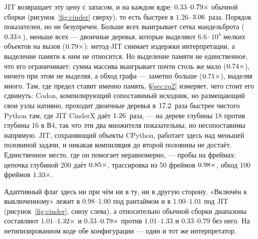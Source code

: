 JIT возвращает эту цену с запасом, и на каждом ядре: $0.33$--$\meas{ratio:b6_cinderx-fork_jit:binarytrees/fork_jit|b6_cinderx-stock:binarytrees/stock}{0.79}\times$ обычной сборки
(рисунок~\ref{fig:cinder} сверху), то есть быстрее в $1.26$--$\meas{ratio:b6_cinderx-stock:mandelbrot/stock|b6_cinderx-fork_jit:mandelbrot/fork_jit}{3.06}$~раза. Порядок показателен, но
не безупречен. Больше всех выигрывает сетка мандельброта ($\meas{ratio:b6_cinderx-fork_jit:mandelbrot/fork_jit|b6_cinderx-stock:mandelbrot/stock}{0.33}\times$), меньше всех --- двоичные
деревья, которые выделяют $6.6\cdot10^4$ мелких объектов на вызов ($\meas{ratio:b6_cinderx-fork_jit:binarytrees/fork_jit|b6_cinderx-stock:binarytrees/stock}{0.79}\times$): метод-JIT снимает
издержки интерпретации, а выделение памяти к ним не относится. Но выделение памяти не
единственное, что его ограничивает: сумма массива выигрывает почти столь же мало ($\meas{ratio:b6_cinderx-fork_jit:arraysum/fork_jit|b6_cinderx-stock:arraysum/stock}{0.74}\times$),
ничего при этом не выделяя, а обход графа --- заметно больше ($\meas{ratio:b6_cinderx-fork_jit:bfs/fork_jit|b6_cinderx-stock:bfs/stock}{0.71}\times$), выделяя много. Там,
где предел ставит именно память, \S\ref{sec:rq2} измеряет, чего стоит его сдвинуть: Codon,
компилирующий сопоставимый исходник, но размещающий свои узлы нативно, проходит двоичные деревья
в $\meas{ratio:b2_branchy-314:binarytrees/cpython_loop|b2_branchy-314:binarytrees/codon_pyext}{17.2}$~раза быстрее чистого Python там, где JIT CinderX даёт $\meas{ratio:b6_cinderx-stock:binarytrees/stock|b6_cinderx-fork_jit:binarytrees/fork_jit}{1.26}$~раза, --- на дереве глубины
18 против глубины 16 в В4, так что эти два множителя показательны, но несопоставимы напрямую. JIT, сохраняющий объекты CPython, работает здесь над меньшей половиной задачи, и
никакая компиляция до второй половины не достаёт. Единственное место, где он помогает
неравномерно, --- пробы на фреймах: цепочка глубиной 200 даёт $\meas{ratio:b6_cinderx-fork_jit:call_depth_200/fork_jit|b6_cinderx-stock:call_depth_200/stock}{0.85}\times$, трассировка из 50
фреймов $\meas{ratio:b6_cinderx-fork_jit:traceback_depth_50/fork_jit|b6_cinderx-stock:traceback_depth_50/stock}{0.98}\times$, обход 100 фреймов $\meas{ratio:b6_cinderx-fork_jit:frame_walk_depth_100/fork_jit|b6_cinderx-stock:frame_walk_depth_100/stock}{1.33}\times$.

Адаптивный флаг здесь ни при чём ни в ту, ни в другую сторону. «Включён к выключенному» лежит в
$0.98$--$1.00$ под рантаймом и в $1.00$--$1.01$ под JIT (рисунок~\ref{fig:cinder}, снизу слева), а
относительно обычной сборки диапазоны составляют $1.01$--$\meas{ratio:b6_cinderx-fork_cinderx_adaptive:mandelbrot/fork_cinderx_adaptive|b6_cinderx-stock:mandelbrot/stock}{1.32}\times$ и $0.33$--$\meas{ratio:b6_cinderx-fork_jit_adaptive:binarytrees/fork_jit_adaptive|b6_cinderx-stock:binarytrees/stock}{0.79}\times$ против
$1.01$--$1.33$ и $0.33$--$0.79$ без него. На нетипизированном коде обе конфигурации --- один и тот
же интерпретатор.

